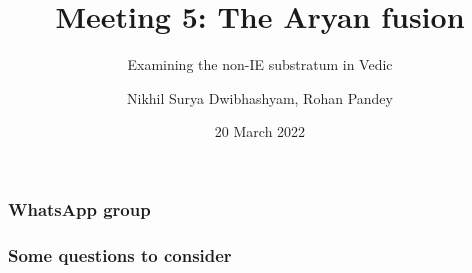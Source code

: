 \documentclass[pdf]{beamer}
\title{Meeting 5: The Aryan fusion}
\subtitle{Examining the non-IE substratum in Vedic}
\author{Nikhil Surya Dwibhashyam, Rohan Pandey}
\date{20 March 2022}
\begin{document}
\frame{\titlepage}

\begin{frame} \frametitle{WhatsApp group}
\end{frame}

\begin{frame}[label=questions] \frametitle{Some questions to consider}
\end{frame}

\end{document}
